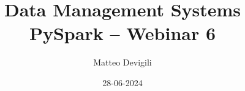 \documentclass[xcolor=dvipsnames]{beamer}
\title{Data Management Systems \\ PySpark -- Webinar 6}
\author{Matteo Devigili}
\institute[A]{Bayes Business School}
\date{28-06-2024}
\begin{document}
\begin{frame}[c]
    \titlepage %
\end{frame}

\end{document}
